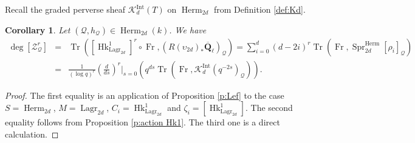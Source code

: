 \documentclass[reqno]{amsart}
\numberwithin{equation}{section}
\newcommand{\F}{\mathbf{F}}
\newcommand{\Q}{\mathbf{Q}}
\newcommand{\mrm}[1]{\mathrm{#1}}
\DeclareMathOperator{\Frob}{Fr}
\DeclareMathOperator{\Tr}{Tr}
\DeclareMathOperator{\Sht}{Sht}
\DeclareMathOperator{\Hk}{Hk}
\DeclareMathOperator{\Herm}{Herm}
\DeclareMathOperator{\Lagr}{Lagr}
\DeclareMathOperator{\Spr}{Spr}
\newcommand{\Qlbar}{\overline{\Q}_\ell}
\renewcommand\c{\circ}
\newcommand{\z}{\zeta}
\renewcommand{\r}{\rho}
\newcommand\cK{\mathcal{K}}
\newcommand\cQ{\mathcal{Q}}
\newcommand\cZ{\mathcal{Z}}
\newtheorem{cor}[thm]{Corollary}
\theoremstyle{remark}
\numberwithin{equation}{section}
\begin{document}
Recall the graded perverse sheaf $\cK^{\mrm{Int}}_{d}(T)$ on $\Herm_{2d}$ from Definition \ref{def:Kd}. 

\begin{cor}\label{cor: trace of correspondence} Let $(\cQ,h_{\cQ})\in \Herm_{2d}(k)$. We have
\begin{eqnarray*}
\deg[\cZ^{r}_{\cQ}]&=&\Tr( [\Hk^{1}_{\Lagr_{2d}}]^r\c\Frob, (R(\upsilon_{2d})_{*}\Qlbar)_{\cQ}) = \sum_{i=0}^d (d-2i)^r \Tr(\Frob, \Spr^{\Herm}_{2d}[\r_{i}]_{\cQ})  \\
&=& \frac{1}{(\log q)^r} \left(\frac{d}{ds}\right)^r\Big|_{s=0} \left(q^{ds}\Tr(\Frob, \cK_d^{\mrm{Int}}(q^{-2s})_{\cQ})\right).
\end{eqnarray*}
\end{cor}
%
\begin{proof}
The first equality is an application of Proposition \ref{p:Lef} to the case $S=\Herm_{2d}$, $M=\Lagr_{2d}$, $C_{i}=\Hk^{1}_{\Lagr_{2d}}$ and $\z_{i}=[\Hk^{1}_{\Lagr_{2d}}]$.  The second equality follows from Proposition \ref{p:action Hk1}. The third one is a direct calculation.
\end{proof}
\end{document}
